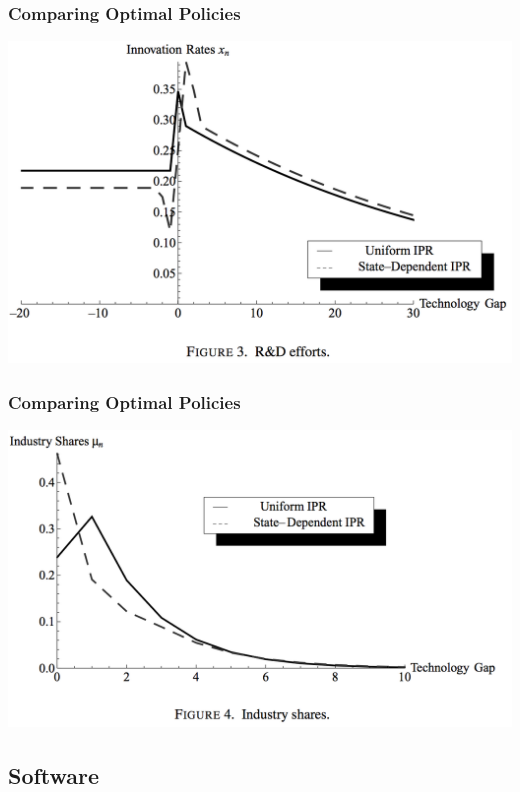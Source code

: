 \documentclass{beamer}
\begin{document}
\begin{frame}[t]\frametitle{Comparing Optimal Policies} 
  \vspace{-5mm}
  \begin{center}
    \includegraphics[scale=.28]{full_ipr_rnd.png}
    \label{fig:full_ipr_rnd}
  \end{center}
\end{frame}

\begin{frame}[t]\frametitle{Comparing Optimal Policies} 
  \vspace{-5mm}
  \begin{center}
    \includegraphics[scale=.28]{full_ipr_distbn.png}
    \label{fig:full_ipr_distbn}
  \end{center}
\end{frame}


\subsection{Software}
\label{sub:software}
\end{document}
